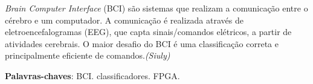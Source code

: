 \begin{resumo}
	\textit{Brain Computer Interface} (BCI) são sistemas que realizam a comunicação entre o cérebro e um computador. A comunicação é realizada através de eletroencefalogramas (EEG), que capta sinais/comandos elétricos, a partir de atividades cerebrais. O maior desafio do BCI é uma classificação correta e principalmente eficiente  de comandos.\textit{(Siuly)}
 \vspace{\onelineskip}
    
 \noindent
 \textbf{Palavras-chaves}: BCI. classificadores. FPGA.
\end{resumo}
